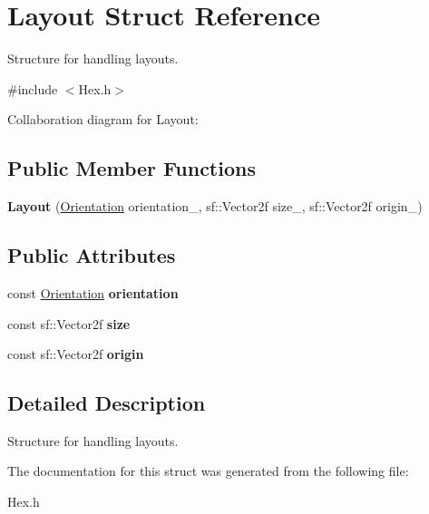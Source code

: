 \hypertarget{structLayout}{}\section{Layout Struct Reference}
\label{structLayout}


Structure for handling layouts.  




{\ttfamily \#include $<$Hex.\+h$>$}



Collaboration diagram for Layout\+:
\subsection*{Public Member Functions}
\begin{DoxyCompactItemize}
\item 
{\bfseries Layout} (\hyperlink{structOrientation}{Orientation} orientation\+\_\+, sf\+::\+Vector2f size\+\_\+, sf\+::\+Vector2f origin\+\_\+)\hypertarget{structLayout_ae56470cdef750130e017c51816791ae0}{}\label{structLayout_ae56470cdef750130e017c51816791ae0}

\end{DoxyCompactItemize}
\subsection*{Public Attributes}
\begin{DoxyCompactItemize}
\item 
const \hyperlink{structOrientation}{Orientation} {\bfseries orientation}\hypertarget{structLayout_a6f0f68d431d3c1346b9f738bb9119307}{}\label{structLayout_a6f0f68d431d3c1346b9f738bb9119307}

\item 
const sf\+::\+Vector2f {\bfseries size}\hypertarget{structLayout_a6b9039fd8658faded3ff6fb346a5aa15}{}\label{structLayout_a6b9039fd8658faded3ff6fb346a5aa15}

\item 
const sf\+::\+Vector2f {\bfseries origin}\hypertarget{structLayout_a794cda8e9718d8daf0271961e9a7ca8d}{}\label{structLayout_a794cda8e9718d8daf0271961e9a7ca8d}

\end{DoxyCompactItemize}


\subsection{Detailed Description}
Structure for handling layouts. 

The documentation for this struct was generated from the following file\+:\begin{DoxyCompactItemize}
\item 
Hex.\+h\end{DoxyCompactItemize}
